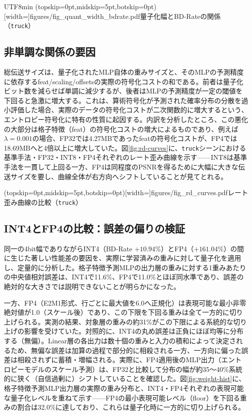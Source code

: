 \documentclass{ieeeaccess}
\begin{document}
\begin{CJK}{UTF8}{min}
\Figure[t!](topskip=0pt,midskip=5pt,botskip=0pt)[width=\columnwidth]{figures/fig_quant_width_bdrate.pdf}{量子化幅とBD-Rateの関係（\texttt{truck}）\label{fig:quant-bdrate}}

\subsection{非単調な関係の要因}
総伝送サイズは、量子化されたMLP自体の重みサイズと、そのMLPの予測精度に依存するfeat/scaling/offsetsの実際の符号化コストの和である。前者は量子化ビット数を減らせば単調に減少するが、後者はMLPの予測精度が一定の閾値を下回ると急激に増大する。これは、算術符号化が予測された確率分布の分散を過小評価した場合、実際のデータの符号化コストが二次関数的に増大するという、エントロピー符号化に特有の性質に起因する。内訳を分析したところ、この悪化の大部分は格子特徴（feat）の符号化コストの増大によるものであり、例えば$\lambda=0.001$の場合、FP32では4.27MBであったfeatの符号化コストが、FP4では18.69MBへと4倍以上に増大していた。図\ref{fig:rd-curves}に、\texttt{truck}シーンにおける基準手法・FP32・INT8・FP4それぞれのレート歪み曲線を示す——INT8は基準手法を一貫して上回る一方、FP4は同程度のPSNRを得るために大幅に大きな伝送サイズを要し、曲線全体が右方向へシフトしていることが見てとれる。

\Figure[t!](topskip=0pt,midskip=5pt,botskip=0pt)[width=\columnwidth]{figures/fig_rd_curves.pdf}{レート歪み曲線の比較（\texttt{truck}）\label{fig:rd-curves}}

\subsection{INT4とFP4の比較：誤差の偏りの検証}
同一の4bit幅でありながらINT4（BD-Rate $+10.94\%$）とFP4（$+161.04\%$）の間に生じた著しい性能差の要因を、実際に学習済みの重みに対して量子化を適用し、定量的に分析した。格子特徴予測MLPの出力層の重みに対する1重みあたりの中央値相対誤差は、INT4で11.6\%、FP4で11.0\%とほぼ同水準であり、誤差の絶対的な大きさでは説明できないことが明らかになった。

一方、FP4（E2M1形式、行ごとに最大値を6.0へ正規化）は表現可能な最小非零絶対値が1.0（スケール後）であり、この下限を下回る重みは全て一方的に切り上げられる。実測の結果、対象層の重みの約31\%がこの下限による系統的な切り上げの影響を受けていた。対照的に、INT4の丸め誤差は正負にほぼ均等に分布する（無偏）。Linear層の各出力は数十個の重みと入力の積和によって決定されるため、無偏な誤差は加算の過程で部分的に相殺される一方、一方向に偏った誤差は相殺されずに蓄積・増幅される。実際に、FP4適用後のMLP出力（エントロピーモデルのスケール予測）は、FP32と比較して分布の幅が約35〜40\%系統的に狭く（自信過剰に）シフトしていることを確認した。図\ref{fig:weight-hist}に、格子特徴予測MLP出力層の実際の重み分布と、INT4・FP4それぞれの表現可能な量子化レベルを重ねて示す——FP4の最小表現可能レベル（floor）を下回る重みの割合は32.0\%に達しており、これらは量子化時に一方的に切り上げられる。


\end{CJK}
\end{document}
